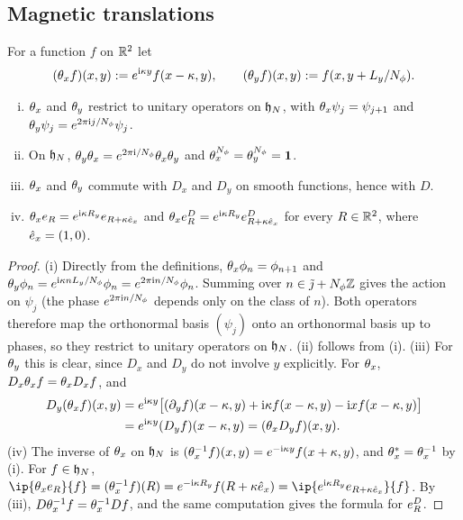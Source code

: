 \subsection{Magnetic translations}

For a function $f$ on $\mathbb{R}^2$ let
\begin{equation}\label{eq:magtrans}
(\theta_x f)(x,y):=e^{\mathrm{i}\kappa y}f(x-\kappa,y),\qquad(\theta_y f)(x,y):=f(x,y+L_y/N_{\phi}).
\end{equation}

\begin{lemma}\label{lem:magtrans}
\begin{enumerate}[(i)]
\item $\theta_x$ and $\theta_y$ restrict to unitary operators on $\mathfrak{h}_N$, with $\theta_x\psi_j=\psi_{j+1}$ and
$\theta_y\psi_j=e^{2\pi\mathrm{i} j/N_{\phi}}\psi_j$.
\item On $\mathfrak{h}_N$, $\theta_y\theta_x=e^{2\pi\mathrm{i}/N_{\phi}}\theta_x\theta_y$ and $\theta_x^{N_{\phi}}=\theta_y^{N_{\phi}}=\mathbf{1}$.
\item $\theta_x$ and $\theta_y$ commute with $D_x$ and $D_y$ on smooth functions, hence with $D$.
\item $\theta_xe_{R}=e^{\mathrm{i}\kappa R_y}e_{R+\kappa\hat{e}_x}$ and $\theta_xe^{D}_{R}=e^{\mathrm{i}\kappa R_y}e^{D}_{R+\kappa\hat{e}_x}$ for every
$R\in\mathbb{R}^2$, where $\hat{e}_x=(1,0)$.
\end{enumerate}
\end{lemma}

\begin{proof}
(i) Directly from the definitions, $\theta_x\phi_n=\phi_{n+1}$ and $\theta_y\phi_n=e^{\mathrm{i}\kappa nL_y/N_{\phi}}\phi_n=e^{2\pi\mathrm{i} n/N_{\phi}}\phi_n$.
Summing over $n\in\tilde\jmath+N_{\phi}\mathbb{Z}$ gives the action on $\psi_j$ (the phase $e^{2\pi\mathrm{i} n/N_{\phi}}$ depends only on
the class of $n$). Both operators therefore map the orthonormal basis $(\psi_j)$ onto an orthonormal basis up
to phases, so they restrict to unitary operators on $\mathfrak{h}_N$. (ii) follows from (i). (iii) For $\theta_y$ this is
clear, since $D_x$ and $D_y$ do not involve $y$ explicitly. For $\theta_x$, $D_x\theta_x f=\theta_x D_xf$, and
\begin{align*}
D_y(\theta_x f)(x,y)&=e^{\mathrm{i}\kappa y}\bigl[(\partial_yf)(x-\kappa,y)+\mathrm{i}\kappa f(x-\kappa,y)-\mathrm{i} xf(x-\kappa,y)\bigr]\\
&=e^{\mathrm{i}\kappa y}(D_yf)(x-\kappa,y)=(\theta_x D_yf)(x,y).
\end{align*}
(iv) The inverse of $\theta_x$ on $\mathfrak{h}_N$ is $(\theta_x^{-1}f)(x,y)=e^{-\mathrm{i}\kappa y}f(x+\kappa,y)$, and $\theta_x^*=\theta_x^{-1}$ by (i).
For $f\in\mathfrak{h}_N$, $\ip{\thx\ev R}{f}=(\thx^{-1}f)(R)=e^{-\iu\kappa R_y}f(R+\kappa\ex)=\ip{e^{\iu\kappa R_y}\ev{R+\kappa\ex}}{f}$.
By (iii), $D\theta_x^{-1}f=\theta_x^{-1}Df$, and the same computation gives the formula for $e^{D}_{R}$.
\end{proof}

